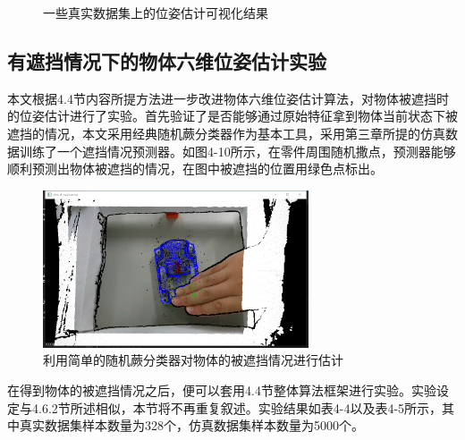 \begin{figure}[htb]
{%
}
\hspace{0.01\linewidth}
\caption{一些真实数据集上的位姿估计可视化结果}
\end{figure}

\newpage

\subsection{有遮挡情况下的物体六维位姿估计实验}

本文根据4.4节内容所提方法进一步改进物体六维位姿估计算法，对物体被遮挡时的位姿估计进行了实验。首先验证了是否能够通过原始特征拿到物体当前状态下被遮挡的情况，本文采用经典随机蕨分类器作为基本工具，采用第三章所提的仿真数据训练了一个遮挡情况预测器。如图4-10所示，在零件周围随机撒点，预测器能够顺利预测出物体被遮挡的情况，在图中被遮挡的位置用绿色点标出。
\begin{figure}[htb]
	\centering 
	\includegraphics[width=0.7\textwidth]{./mypic/1.png} 
	\caption{利用简单的随机蕨分类器对物体的被遮挡情况进行估计} 
\end{figure}

在得到物体的被遮挡情况之后，便可以套用4.4节整体算法框架进行实验。实验设定与4.6.2节所述相似，本节将不再重复叙述。实验结果如表4-4以及表4-5所示，其中真实数据集样本数量为328个，仿真数据集样本数量为5000个。

